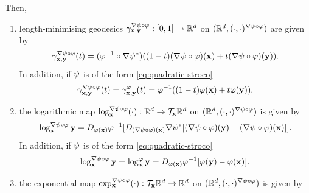 \begin{proposition}
        Then,
        \begin{enumerate}[label=(\roman*)]
            \item length-minimising geodesics $\gamma^{\nabla \psi \circ \varphi}_{\mathbf{x}, \mathbf{y}}:[0,1] \to \mathbb{R}^d$ on $(\mathbb{R}^d, (\cdot,\cdot)^{\nabla \psi \circ \varphi})$ are given by 
            \begin{equation}
                \gamma^{\nabla \psi \circ \varphi}_{\mathbf{x}, \mathbf{y}}(t)= (\varphi^{-1} \circ\nabla \psi^*) ((1 - t)(\nabla \psi \circ \varphi)(\mathbf{x}) + t (\nabla \psi \circ \varphi)(\mathbf{y})).
                \label{eq:thm-geodesic-remetrized}
            \end{equation}
            In addition, if $\psi$ is of the form \ref{eq:quadratic-stroco}
            \begin{equation}
                \gamma^{\nabla \psi \circ \varphi}_{\mathbf{x}, \mathbf{y}}(t) = \gamma^\varphi_{\mathbf{x}, \mathbf{y}}(t) = \varphi^{-1}((1 - t)\varphi(\mathbf{x}) + t \varphi(\mathbf{y})).
                \label{eq:thm-geodesic-remetrized-special-psi}
            \end{equation}
            \item the logarithmic map $\log^{\nabla \psi \circ \varphi}_{\mathbf{x}} (\cdot):\mathbb{R}^d \to \mathcal{T}_{\mathbf{x}} \mathbb{R}^d$  on $(\mathbb{R}^d, (\cdot,\cdot)^{\nabla \psi \circ \varphi})$ is given by 
            \begin{equation}
                \log^{\nabla \psi \circ \varphi}_{\mathbf{x}} \mathbf{y} =  D_{\varphi(\mathbf{x})}\varphi^{-1}[D_{(\nabla \psi \circ \varphi)(\mathbf{x})}\nabla \psi^*[(\nabla \psi \circ \varphi)(\mathbf{y}) - (\nabla \psi \circ \varphi)(\mathbf{x})]].
                \label{eq:thm-log-remetrized}
            \end{equation}
            In addition, if $\psi$ is of the form \ref{eq:quadratic-stroco}
            \begin{equation}
                \log^{\nabla \psi \circ \varphi}_{\mathbf{x}} \mathbf{y} = \log^\varphi_{\mathbf{x}} \mathbf{y} = D_{\varphi(\mathbf{x})}\varphi^{-1}[\varphi(\mathbf{y}) - \varphi(\mathbf{x})].
                \label{eq:thm-log-remetrized-special-psi}
            \end{equation}
            \item the exponential map $\exp^{\nabla \psi \circ \varphi}_{\mathbf{x}} (\cdot):\mathcal{T}_{\mathbf{x}} \mathbb{R}^d \to \mathbb{R}^d$ on $(\mathbb{R}^d, (\cdot,\cdot)^{\nabla \psi \circ \varphi})$ is given by 

\end{enumerate}
\end{proposition}
